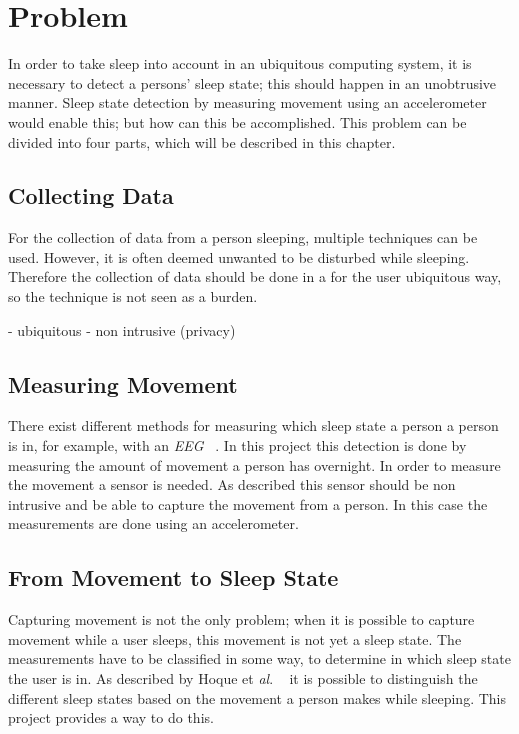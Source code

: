\chapter{Problem} %
\label{cha:problem}
In order to take sleep into account in an ubiquitous computing system, it is necessary to detect a persons' sleep state; this should happen in an unobtrusive manner. Sleep state detection by measuring movement using an accelerometer would enable this; but how can this be accomplished. This problem can be divided into four parts, which will be described in this chapter.

\section{Collecting Data} %
\label{sec:collecting_data}
For the collection of data from a person sleeping, multiple techniques can be used. However, it is often deemed unwanted to be disturbed while sleeping. Therefore the collection of data should be done in a for the user ubiquitous way, so the technique is not seen as a burden.

- ubiquitous
- non intrusive (privacy)

\section{Measuring Movement} %
\label{sec:measuring_movement}
There exist different methods for measuring which sleep state a person a person is in, for example, with an \emph{EEG} ~\cite{Itil196976}. In this project this detection is done by measuring the amount of movement a person has overnight. In order to measure the movement a sensor is needed. As described this sensor should be non intrusive and be able to capture the movement from a person. In this case the measurements are done using an accelerometer.



\section{From Movement to Sleep State} %
\label{sec:translate_movement_patterns_to_sleep_states}
Capturing movement is not the only problem; when it is possible to capture movement while a user sleeps, this movement is not yet a sleep state. The measurements have to be classified in some way, to determine in which sleep state the user is in. As described by Hoque et \emph{al}. ~\cite{Hoque:2010:MBP:1921081.1921088} it is possible to distinguish the different sleep states based on the movement a person makes while sleeping. This project provides a way to do this.

